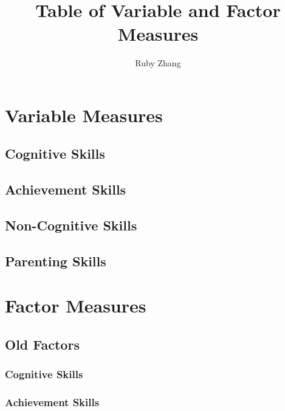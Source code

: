 \documentclass[11pt]{article}
\begin{document}
\title{Table of Variable and Factor Measures}
\author{Ruby Zhang}
\maketitle

\section{Variable Measures}

  \subsection{Cognitive Skills}
  

  \subsection{Achievement Skills}
  

  \subsection{Non-Cognitive Skills}
  

  \subsection{Parenting Skills}
  

\newpage

\section{Factor Measures}

  \subsection{Old Factors}

    \subsubsection{Cognitive Skills}
    

    \subsubsection{Achievement Skills}
    
\end{document}
